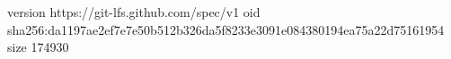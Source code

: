 version https://git-lfs.github.com/spec/v1
oid sha256:da1197ae2ef7e7e50b512b326da5f8233e3091e084380194ea75a22d75161954
size 174930

